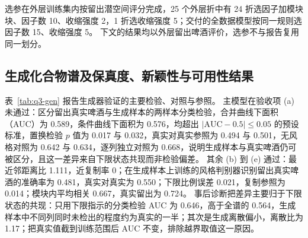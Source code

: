 选参在外层训练集内按留出潜空间评分完成，25 个外层折中有 24 折选因子加模块块、因子数 10、收缩强度 2，1 折选收缩强度 5；交付的全数据模型按同一规则选因子数 15、收缩强度 5。
下文的结果均以外层留出啤酒评价，选参不与报告复用同一划分。

\subsection{生成化合物谱及保真度、新颖性与可用性结果}

表~\ref{tab:q3-gen} 报告生成器验证的主要检验、对照与参照。
主模型在验收项 (a) 未通过：区分留出真实啤酒与生成样本的两样本分类检验，合并曲线下面积（AUC）为 0.589，条件曲线下面积为 0.576，均超出 $|\mathrm{AUC}-0.5|\le0.05$ 的预设标准，置换检验 $p$ 值为 0.017 与 0.032，真实对真实参照为 0.494 与 0.501，无风格对照为 0.642 与 0.634，逐列独立对照为 0.668，说明生成样本与真实啤酒仍可被区分，且这一差异来自下限状态共现而非检验偏差。
其余 (b) 到 (e) 通过：最近邻距离比 1.111，近复制率 0；在生成样本上训练的风格判别器识别留出真实啤酒的准确率为 0.481，真实对真实为 0.550；下限比例误差 0.021，复制参照为 0.014；模块内平均相关 0.667，真实留出为 0.724。
事后诊断把差异主要归于下限状态的共现：只用下限指示的分类检验 AUC 为 0.646，高于全谱的 0.564，生成样本中不同列同时未检出的程度约为真实的一半；其次是生成离散偏小，离散比为 1.17；把真实值截到训练范围后 AUC 不变，排除越界取值这一原因。

\begin{table}[H]
\centering\small
\caption{问题三生成器验证}
\label{tab:q3-gen}
\end{table}

